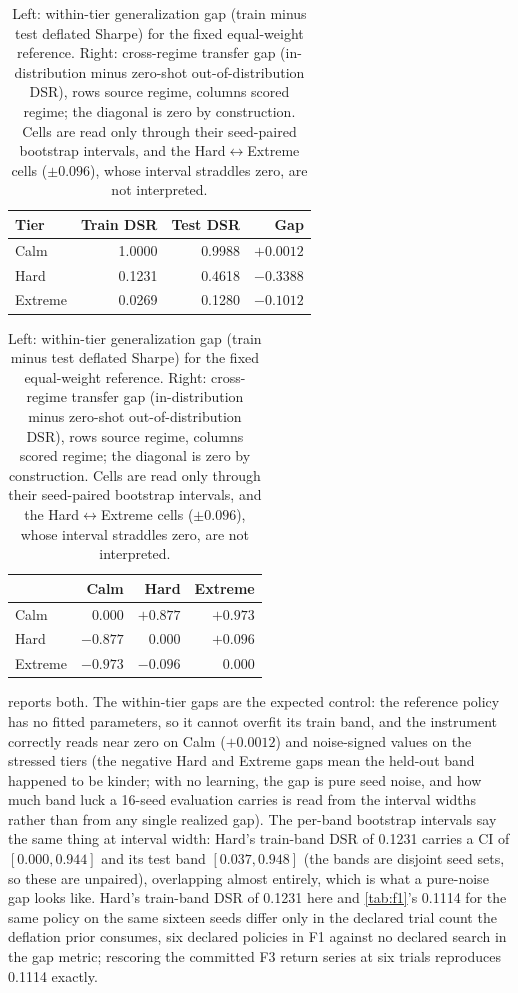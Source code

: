 \begin{table}[t]
\centering
\caption{Left: within-tier generalization gap (train minus test deflated Sharpe) for the fixed equal-weight reference. Right: cross-regime transfer gap (in-distribution minus zero-shot out-of-distribution DSR), rows source regime, columns scored regime; the diagonal is zero by construction. Cells are read only through their seed-paired bootstrap intervals, and the Hard$\leftrightarrow$Extreme cells ($\pm 0.096$), whose interval straddles zero, are not interpreted.}
\label{tab:f3}
\small
\begin{tabular}{lrrr}
\toprule
Tier & Train DSR & Test DSR & Gap \\
\midrule
Calm & 1.0000 & 0.9988 & $+0.0012$ \\
Hard & 0.1231 & 0.4618 & $-0.3388$ \\
Extreme & 0.0269 & 0.1280 & $-0.1012$ \\
\bottomrule
\end{tabular}
\hspace{1.5em}
\begin{tabular}{lrrr}
\toprule
 & Calm & Hard & Extreme \\
\midrule
Calm & 0.000 & $+0.877$ & $+0.973$ \\
Hard & $-0.877$ & 0.000 & $+0.096$ \\
Extreme & $-0.973$ & $-0.096$ & 0.000 \\
\bottomrule
\end{tabular}
\end{table}

 reports both. The within-tier gaps are the expected control: the reference policy has no fitted parameters, so it cannot overfit its train band, and the instrument correctly reads near zero on Calm ($+0.0012$) and noise-signed values on the stressed tiers (the negative Hard and Extreme gaps mean the held-out band happened to be kinder; with no learning, the gap is pure seed noise, and how much band luck a 16-seed evaluation carries is read from the interval widths rather than from any single realized gap). The per-band bootstrap intervals say the same thing at interval width: Hard's train-band DSR of 0.1231 carries a CI of $[0.000, 0.944]$ and its test band $[0.037, 0.948]$ (the bands are disjoint seed sets, so these are unpaired), overlapping almost entirely, which is what a pure-noise gap looks like. Hard's train-band DSR of 0.1231 here and \cref{tab:f1}'s 0.1114 for the same policy on the same sixteen seeds differ only in the declared trial count the deflation prior consumes, six declared policies in F1 against no declared search in the gap metric; rescoring the committed F3 return series at six trials reproduces 0.1114 exactly.

